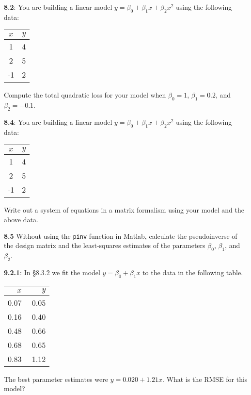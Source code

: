 \documentclass[pal,wide,12pt]{pajarticle}
\newenvironment{problem}[1]{\noindent\textbf{#1}:}{\newpage}
\begin{document}
\begin{problem}{8.2}
You are building a linear model $y = \beta_0 + \beta_1x + \beta_2x^2$ using the following data:

\begin{center}
	\begin{tabular}{cc}
		\toprule
		$x$ & $y$ \\
		\midrule
		1 & 4 \\
		2 & 5 \\
		-1 & 2 \\
		\bottomrule	
	\end{tabular}
\end{center}
\noindent
Compute the total quadratic loss for your model when $\beta_0 = 1$, $\beta_1=0.2$, and $\beta_2=-0.1$.
\end{problem}

\begin{problem}{8.4}
You are building a linear model $y = \beta_0 + \beta_1x + \beta_2x^2$ using the following data:

\begin{center}
	\begin{tabular}{cc}
		\toprule
		$x$ & $y$ \\
		\midrule
		1 & 4 \\
		2 & 5 \\
		-1 & 2 \\
		\bottomrule	
	\end{tabular}
\end{center}
\noindent
Write out a system of equations in a matrix formalism using your model and the above data. 

\vspace{3in}
\noindent
\textbf{8.5} Without using the \verb|pinv| function in Matlab, calculate the pseudoinverse of the design matrix and the least-squares estimates of the parameters $\beta_0$, $\beta_1$, and $\beta_2$.
\end{problem}

\begin{problem}{9.2.1}
In \S 8.3.2 we fit the model $y = \beta_0 + \beta_1x$ to the data in the following table.
\begin{center}
	\begin{tabular}{rr}
		\toprule
		$x$ & $y$ \\
		\midrule
		0.07 & -0.05 \\
		0.16 & 0.40 \\
		0.48 & 0.66 \\
		0.68 & 0.65 \\
		0.83 & 1.12 \\
		\bottomrule	
	\end{tabular}
\end{center}
The best parameter estimates were $y = 0.020 + 1.21x$. What is the RMSE for this model?
\end{problem}
\end{document}
